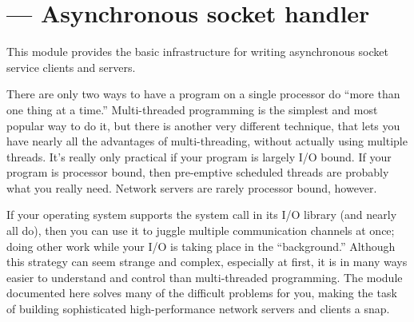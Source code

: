 \section{ ---
         Asynchronous socket handler}


This module provides the basic infrastructure for writing asynchronous 
socket service clients and servers.

There are only two ways to have a program on a single processor do 
``more than one thing at a time.'' Multi-threaded programming is the 
simplest and most popular way to do it, but there is another very 
different technique, that lets you have nearly all the advantages of 
multi-threading, without actually using multiple threads.  It's really 
only practical if your program is largely I/O bound.  If your program 
is processor bound, then pre-emptive scheduled threads are probably what 
you really need. Network servers are rarely processor bound, however.

If your operating system supports the  system call 
in its I/O library (and nearly all do), then you can use it to juggle 
multiple communication channels at once; doing other work while your 
I/O is taking place in the ``background.''  Although this strategy can 
seem strange and complex, especially at first, it is in many ways 
easier to understand and control than multi-threaded programming.  
The module documented here solves many of the difficult problems for 
you, making the task of building sophisticated high-performance 
network servers and clients a snap.

